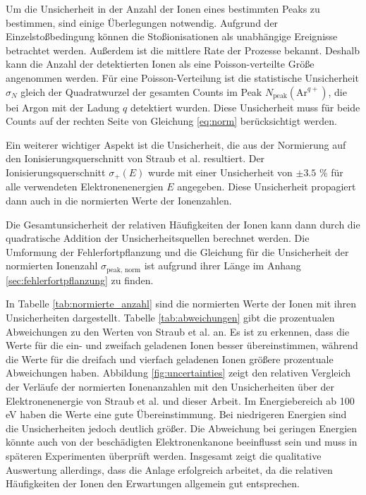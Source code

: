 Um die Unsicherheit in der Anzahl der Ionen eines bestimmten Peaks zu bestimmen, sind einige Überlegungen notwendig. Aufgrund der Einzelstoßbedingung können die Stoßionisationen als unabhängige Ereignisse betrachtet werden. Außerdem ist die mittlere Rate der Prozesse bekannt. Deshalb kann die Anzahl der detektierten Ionen als eine Poisson-verteilte Größe angenommen werden. Für eine Poisson-Verteilung ist die statistische Unsicherheit $\sigma_N$ gleich der Quadratwurzel der gesamten Counts im Peak $N_{\text{peak}}(\text{Ar}^{q+})$, die bei Argon mit der Ladung $q$ detektiert wurden. Diese Unsicherheit muss für beide Counts auf der rechten Seite von Gleichung \ref{eq:norm} berücksichtigt werden.

Ein weiterer wichtiger Aspekt ist die Unsicherheit, die aus der Normierung auf den Ionisierungsquerschnitt von Straub et al. resultiert. Der Ionisierungsquerschnitt $\sigma_+(E)$ wurde mit einer Unsicherheit von $\pm 3.5$ \% für alle verwendeten Elektronenenergien $E$ angegeben. Diese Unsicherheit propagiert dann auch in die normierten Werte der Ionenzahlen. 

Die Gesamtunsicherheit der relativen Häufigkeiten der Ionen kann dann durch die quadratische Addition der Unsicherheitsquellen berechnet werden. Die Umformung der Fehlerfortpflanzung und die Gleichung für die Unsicherheit der normierten Ionenzahl $\sigma_\text{peak, norm}$ ist aufgrund ihrer Länge im Anhang \ref{sec:fehlerfortpflanzung} zu finden.

In Tabelle \ref{tab:normierte_anzahl} sind die normierten Werte der Ionen mit ihren Unsicherheiten dargestellt. Tabelle \ref{tab:abweichungen} gibt die prozentualen Abweichungen zu den Werten von Straub et al. \cite{Straub} an. Es ist zu erkennen, dass die Werte für die ein- und zweifach geladenen Ionen besser übereinstimmen, während die Werte für die dreifach und vierfach geladenen Ionen größere prozentuale Abweichungen haben. Abbildung \ref{fig:uncertainties} zeigt den relativen Vergleich der Verläufe der normierten Ionenanzahlen mit den Unsicherheiten über der Elektronenenergie von Straub et al. und dieser Arbeit. Im Energiebereich ab 100 eV haben die Werte eine gute Übereinstimmung. Bei niedrigeren Energien sind die Unsicherheiten jedoch deutlich größer. Die Abweichung bei geringen Energien könnte auch von der beschädigten Elektronenkanone beeinflusst sein und muss in späteren Experimenten überprüft werden. Insgesamt zeigt die qualitative Auswertung allerdings, dass die Anlage erfolgreich arbeitet, da die relativen Häufigkeiten der Ionen den Erwartungen allgemein gut entsprechen.  

